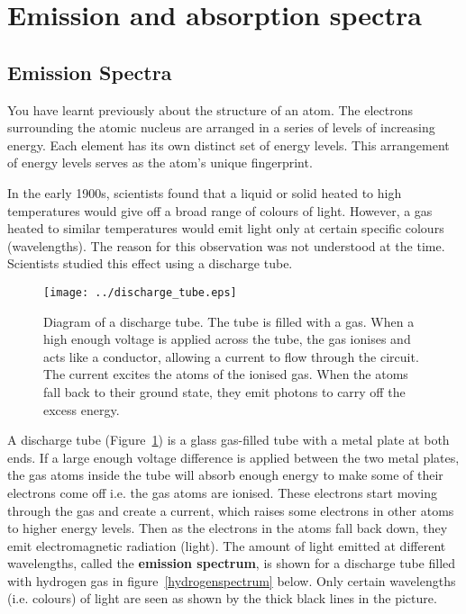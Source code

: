 \section{Emission and absorption spectra}

\subsection{Emission Spectra}

You have learnt previously about the structure of an atom.  The electrons surrounding the atomic nucleus are arranged in a series of levels of increasing energy.  Each element has its own distinct set of energy levels.  This arrangement of energy levels serves as the atom's unique fingerprint.
 
In the early 1900s, scientists found that a liquid or solid heated to high temperatures would give off a broad range of colours of light. However, a gas heated to similar temperatures would emit light only at certain specific colours (wavelengths).  The reason for this observation was not understood at the time.\\  
 
Scientists studied this effect using a discharge tube.  

\begin{figure}[H]
\begin{center}
\texttt{[image: ../discharge\_tube.eps]}
\end{center}
\caption{Diagram of a discharge tube.  The tube is filled with a gas.  When a high enough voltage is applied across the tube, the gas ionises and acts like a conductor, allowing a current to flow through the circuit.  The current excites the atoms of the ionised gas.  When the atoms fall back to their ground state, they emit photons to carry off the excess energy.}
\label{dischargetube}
\end{figure}


A discharge tube (Figure~\ref{dischargetube}) is a glass gas-filled tube with a metal plate at both ends. If a large enough voltage difference is applied between the two metal plates, the gas atoms inside the tube will absorb enough energy to make some of their electrons come off i.e. the gas atoms are ionised. These electrons start moving through the gas and create a current, which raises some electrons in other atoms to higher energy levels. Then as the electrons in the atoms fall back down, they emit electromagnetic radiation (light). The amount of light emitted at different wavelengths, called the \textbf{emission spectrum}, is shown for a discharge tube filled with hydrogen gas in figure~\ref{hydrogenspectrum} below. Only certain wavelengths (i.e. colours) of light are seen as shown by the thick black lines in the picture.

